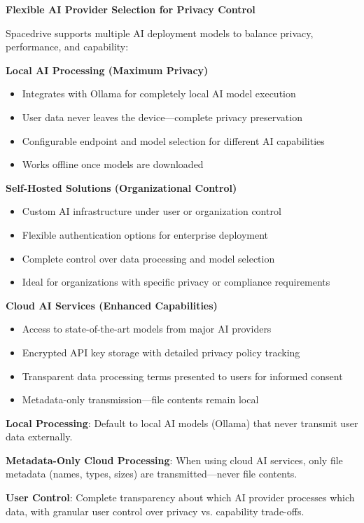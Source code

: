 \documentclass[sigconf]{acmart}
\begin{document}
\textbf{Flexible AI Provider Selection for Privacy Control}

Spacedrive supports multiple AI deployment models to balance privacy, performance, and capability:

\textbf{Local AI Processing (Maximum Privacy)}
\begin{itemize}[noitemsep, topsep=0pt]
 \item Integrates with Ollama for completely local AI model execution
 \item User data never leaves the device---complete privacy preservation
 \item Configurable endpoint and model selection for different AI capabilities
 \item Works offline once models are downloaded
\end{itemize}

\textbf{Self-Hosted Solutions (Organizational Control)}
\begin{itemize}[noitemsep, topsep=0pt]
 \item Custom AI infrastructure under user or organization control
 \item Flexible authentication options for enterprise deployment
 \item Complete control over data processing and model selection
 \item Ideal for organizations with specific privacy or compliance requirements
\end{itemize}

\textbf{Cloud AI Services (Enhanced Capabilities)}
\begin{itemize}[noitemsep, topsep=0pt]
 \item Access to state-of-the-art models from major AI providers
 \item Encrypted API key storage with detailed privacy policy tracking
 \item Transparent data processing terms presented to users for informed consent
 \item Metadata-only transmission---file contents remain local
\end{itemize}


\textbf{Local Processing}: Default to local AI models (Ollama) that never transmit user data externally.

\textbf{Metadata-Only Cloud Processing}: When using cloud AI services, only file metadata (names, types, sizes) are transmitted---never file contents.

\textbf{User Control}: Complete transparency about which AI provider processes which data, with granular user control over privacy vs. capability trade-offs.
\end{document}
